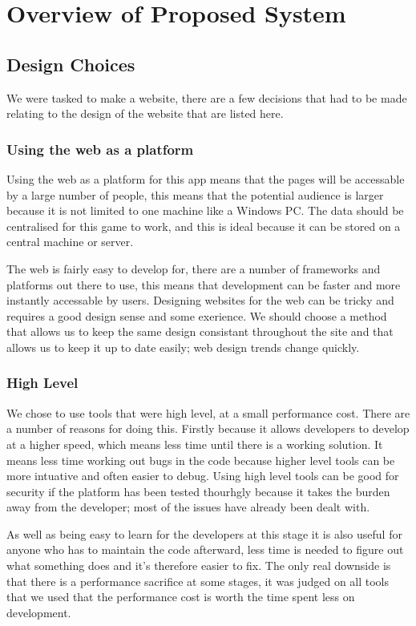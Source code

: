 \documentclass{article}
\begin{document}
\section{Overview of Proposed System}

\subsection{Design Choices}
We were tasked to make a website, there are a few decisions that had to be made relating to the design of the website that are listed here.

\subsubsection{Using the web as a platform}
Using the web as a platform for this app means that the pages will be accessable by a large number of people, this means that the potential audience is larger because it is not limited to one machine like a Windows PC. The data should be centralised for this game to work, and this is ideal because it can be stored on a central machine or server.

The web is fairly easy to develop for, there are a number of frameworks and platforms out there to use, this means that development can be faster and more instantly accessable by users. Designing websites for the web can be tricky and requires a good design sense and some exerience. We should choose a method that allows us to keep the same design consistant throughout the site and that allows us to keep it up to date easily; web design trends change quickly.

\subsubsection{High Level}
We chose to use tools that were high level, at a small performance cost. There are a number of reasons for doing this. Firstly because it allows developers to develop at a higher speed, which means less time until there is a working solution. It means less time working out bugs in the code because higher level tools can be more intuative and often easier to debug. Using high level tools can be good for security if the platform has been tested thourhgly because it takes the burden away from the developer; most of the issues have already been dealt with.

As well as being easy to learn for the developers at this stage it is also useful for anyone who has to maintain the code afterward, less time is needed to figure out what something does and it's therefore easier to fix. The only real downside is that there is a performance sacrifice at some stages, it was judged on all tools that we used that the performance cost is worth the time spent less on development.
\end{document}
